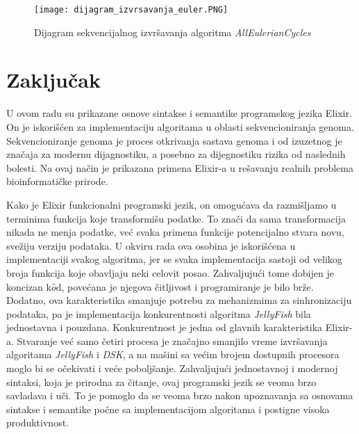 \documentclass[12pt,oneside]{memoir}
\begin{document}
\begin{figure}[!ht]
  \centering
  \texttt{[image: dijagram\_izvrsavanja\_euler.PNG]}
  \caption{Dijagram sekvencijalnog izvršavanja algoritma \textit{AllEulerianCycles}}
  \label{fig:dijagramIzvrsavanjaEuler}
\end{figure}

\chapter{Zaključak}
\label{poglavlje:Zaključak}

U ovom radu su prikazane osnove sintakse i semantike programskog jezika Elixir. On je iskorišćen za implementaciju algoritama u oblasti sekvencioniranja genoma. Sekvencioniranje genoma je proces otkrivanja sastava genoma i od izuzetnog je značaja za modernu dijagnostiku, a posebno za dijegnostiku rizika od naslednih bolesti. Na ovaj način je prikazana primena Elixir-a u rešavanju realnih problema bioinformatičke prirode.

Kako je Elixir funkcionalni programski jezik, on omogućava da razmišljamo u terminima funkcija koje transformišu podatke. To znači da sama transformacija nikada ne menja podatke, već svaka primena funkcije potencijalno stvara novu, svežiju verziju podataka. U okviru rada ova osobina je iskorišćena u implementaciji svakog algoritma, jer se svaka implementacija sastoji od velikog broja funkcija koje obavljaju neki celovit posao.  Zahvaljujući tome dobijen je koncizan k$\hat{o}$d, povećana je njegova čitljivost i programiranje je bilo brže. Dodatno, ova karakteristika smanjuje potrebu za mehanizmima za sinhronizaciju podataka, pa je implementacija konkurentnosti algoritma \textit{JellyFish} bila jednostavna i pouzdana. Konkurentnost je jedna od glavnih karakteristika Elixir-a. Stvaranje već samo četiri procesa je značajno smanjilo vreme izvršavanja algoritama \textit{JellyFish} i \textit{DSK}, a na mašini sa većim brojem dostupnih procesora moglo bi se očekivati i veće poboljšanje. Zahvaljujući jednostavnoj i modernoj sintaksi, koja je prirodna za čitanje, ovaj programski jezik se veoma brzo savladava i uči. To je pomoglo da se veoma brzo nakon upoznavanja sa osnovama sintakse i semantike počne sa implementacijom algoritama i postigne visoka produktivnost.
\end{document}
